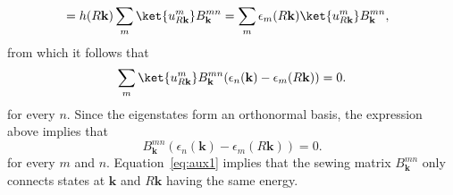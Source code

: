 {\begin{equation}
\begin{aligned}
&=h(R{\mathbf{k}})\sum_m \ket{u_{R{\mathbf{k}}}^m} B_{\mathbf{k}}^{mn} =\sum_m \epsilon_m(R{\mathbf{k}}) \ket{u_{R{\mathbf{k}}}^m} B_{\mathbf{k}}^{mn},
\end{aligned}
\end{equation}
from which it follows that
\begin{equation}
\sum_m \ket{u_{R{\mathbf{k}}}^m} B_{\mathbf{k}}^{mn} (\epsilon_n({\mathbf{k}})-\epsilon_m(R{\mathbf{k}}))=0.
\end{equation}
for every $n$. Since the eigenstates form an orthonormal basis, the expression above implies that
\begin{equation}
B_{\mathbf{k}}^{mn} (\epsilon_n({\mathbf{k}})-\epsilon_m(R{\mathbf{k}}))=0.
\label{eq:aux1}
\end{equation}
for every $m$ and $n$. Equation~\eqref{eq:aux1} implies that the sewing matrix $B_{\mathbf{k}}^{mn}$ only connects states at ${\mathbf{k}}$ and $R{\mathbf{k}}$ having the same energy. 

}
